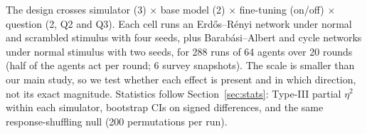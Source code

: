 \documentclass[letterpaper]{article} %
\begin{document}
The design crosses simulator (3) $\times$ base model (2) $\times$ fine-tuning (on/off) $\times$ question (2, Q2 and Q3). Each cell runs an Erd\H{o}s--R\'enyi network under normal and scrambled stimulus with four seeds, plus Barab\'asi--Albert and cycle networks under normal stimulus with two seeds, for 288 runs of 64 agents over 20 rounds (half of the agents act per round; 6 survey snapshots). The scale is smaller than our main study, so we test whether each effect is present and in which direction, not its exact magnitude. Statistics follow Section~\ref{sec:stats}: Type-III partial $\eta^2$ within each simulator, bootstrap CIs on signed differences, and the same response-shuffling null (200 permutations per run).

\begin{table}[t]
\centering
\small
\setlength{\tabcolsep}{4pt}

\caption{Cross-simulator replication (288 runs). Fine-tuning: partial $\eta^2$ of fine-tuning status on OSR within each simulator (model, fine-tuning$\times$model, graph and question in the model) and the signed OSR change from turning the adapters on, per base model. Scrambled floor share: OSR under scrambled stimulus divided by OSR under normal stimulus (Erd\H{o}s--R\'enyi runs). Order consistency: range over model$\times$fine-tuning cells. Flip rate: share of answers that flip by the next snapshot, lowest vs.\ highest margin quintile. NASR: mean real minus response-shuffled null, with the share of runs significant at $p<.05$ in parentheses. The first row repeats the corresponding values from our simulator.}
\label{tab:xsim}
\end{table}
\end{document}
